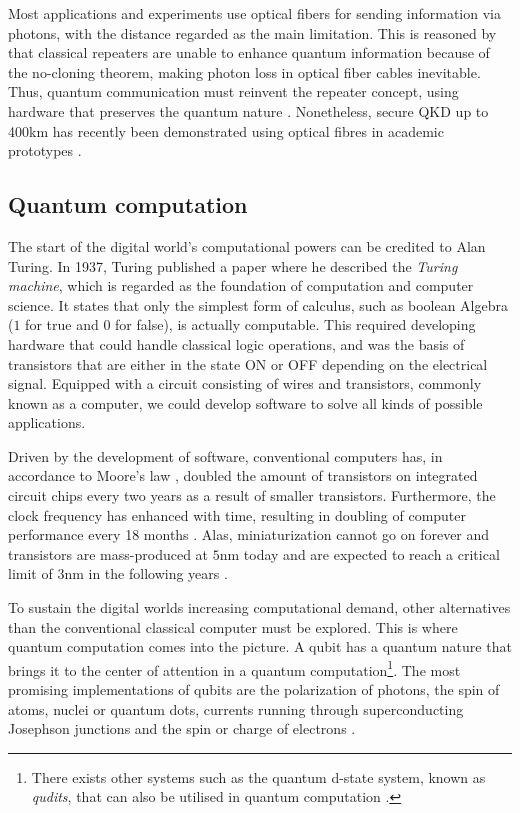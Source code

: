 Most applications and experiments use optical fibers for sending information via photons, with the distance regarded as the main limitation. This is reasoned by that classical repeaters are unable to enhance quantum information because of the no-cloning theorem, making photon loss in optical fiber cables inevitable. Thus, quantum communication must reinvent the repeater concept, using hardware that preserves the quantum nature \cite{Acin2018}. Nonetheless, secure QKD up to 400km has recently been demonstrated using optical fibres in academic prototypes \cite{Boaron2018}.

\subsection{Quantum computation}
The start of the digital world's computational powers can be credited to Alan Turing. In 1937, Turing \cite{Turing1937} published a paper where he described the \textit{Turing machine}, which is regarded as the foundation of computation and computer science. It states that only the simplest form of calculus, such as boolean Algebra ($1$ for true and $0$ for false), is actually computable. This required developing hardware that could handle classical logic operations, and was the basis of transistors that are either in the state ON or OFF depending on the electrical signal. Equipped with a circuit consisting of wires and transistors, commonly known as a computer, we could develop software to solve all kinds of possible applications.

Driven by the development of software, conventional computers has, in accordance to Moore's law \cite{Moore1965}, doubled the amount of transistors on integrated circuit chips every two years as a result of smaller transistors. Furthermore, the clock frequency has enhanced with time, resulting in doubling of computer performance every 18 months \cite{Pavicic2006}. Alas, miniaturization cannot go on forever and transistors are mass-produced at $5$nm today and are expected to reach a critical limit of $3$nm in the following years \cite{Gwennap2020}.

To sustain the digital worlds increasing computational demand, other alternatives than the conventional classical computer must be explored. This is where quantum computation comes into the picture. A qubit has a quantum nature that brings it to the center of attention in a quantum computation\footnote{There exists other systems such as the quantum d-state system, known as \textit{qudits}, that can also be utilised in quantum computation \cite{Ladd2010}.}. The most promising implementations of qubits are the polarization of photons, the spin of atoms, nuclei or quantum dots, currents running through superconducting Josephson junctions and the spin or charge of electrons \cite{Bathen2020}.

